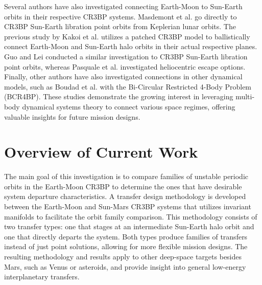Several authors have also investigated connecting Earth-Moon to Sun-Earth orbits in their
respective CR3BP systems. Masdemont et al. go directly to CR3BP Sun-Earth libration point orbits
from Keplerian lunar orbits\cite{Masdemont:2021}. The previous study by Kakoi et al. utilizes a
patched CR3BP model to ballistically connect Earth-Moon and Sun-Earth halo orbits in their actual
respective planes\cite{Kakoi:2014}. Guo and Lei conducted a similar investigation to CR3BP
Sun-Earth libration point orbits\cite{Guo:2019}, whereas Pasquale et al. investigated heliocentric
escape options\cite{Pasquale:2021}. Finally, other authors have also investigated connections in
other dynamical models, such as Boudad et al. with the Bi-Circular Restricted 4-Body Problem
(BCR4BP)\cite{Boudad:2021}. These studies demonstrate the growing interest in leveraging multi-body
dynamical systems theory to connect various space regimes, offering valuable insights for future
mission designs.

\section{Overview of Current Work}
The main goal of this investigation is to compare families of unstable periodic orbits in the
Earth-Moon CR3BP to determine the ones that have desirable system departure characteristics. A
transfer design methodology is developed between the Earth-Moon and Sun-Mars CR3BP systems that
utilizes invariant manifolds to facilitate the orbit family comparison. This methodology consists
of two transfer types: one that stages at an intermediate Sun-Earth halo orbit and one that
directly departs the system. Both types produce families of transfers instead of just point
solutions, allowing for more flexible mission designs. The resulting methodology and results apply
to other deep-space targets besides Mars, such as Venus or asteroids, and provide insight into
general low-energy interplanetary transfers.


